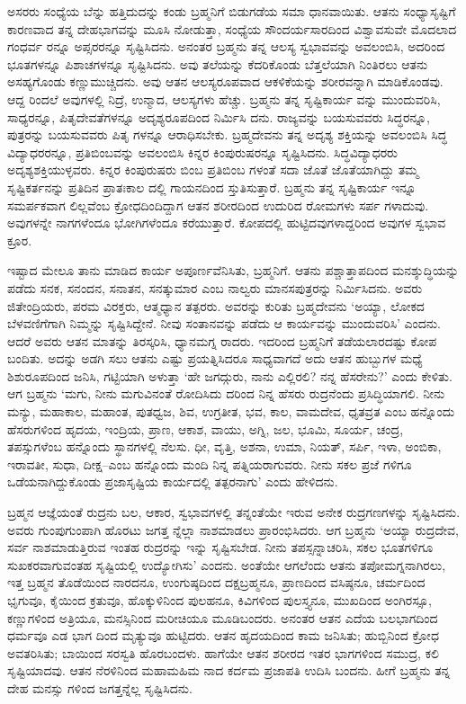ಅಸರರು ಸಂಧ್ಯೆಯ ಬೆನ್ನು ಹತ್ತಿದುದನ್ನು ಕಂಡು ಬ್ರಹ್ಮನಿಗೆ ಬಿಡುಗಡೆಯ ಸಮಾ ಧಾನವಾಯಿತು. ಆತನು ಸಂಧ್ಯಾಸೃಷ್ಟಿಗೆ ಕಾರಣವಾದ ತನ್ನ ದೇಹಭಾಗವನ್ನು ಮೂಸಿ ನೋಡುತ್ತಾ, ಸಂಧ್ಯೆಯ ಸೌಂದರ್ಯಸಾರದಿಂದ ವಿಶ್ವಾವಸುವೇ ಮೊದಲಾದ ಗಂಧರ್ವ ರನ್ನೂ ಅಪ್ಸರರನ್ನೂ ಸೃಷ್ಟಿಸಿದನು. ಅನಂತರ ಬ್ರಹ್ಮನು ತನ್ನ ಆಲಸ್ಯ ಸ್ವಭಾವವನ್ನು ಅವಲಂಬಿಸಿ, ಅದರಿಂದ ಭೂತಗಳನ್ನೂ ಪಿಶಾಚಗಳನ್ನೂ ಸೃಷ್ಟಿಸಿದನು. ಅವು ತಲೆಯನ್ನು ಕೆದರಿಕೊಂಡು ಬೆತ್ತಲೆಯಾಗಿ ನಿಂತಿರಲು ಆತನು ಅಸಹ್ಯಗೊಂಡು ಕಣ್ಣುಮುಚ್ಚಿದನು. ಅವು ಆತನ ಆಲಸ್ಯರೂಪವಾದ ಆಕಳಿಕೆಯನ್ನು ಶರೀರವನ್ನಾಗಿ ಮಾಡಿಕೊಂಡವು. ಆದ್ದ ರಿಂದಲೆ ಅವುಗಳಲ್ಲಿ ನಿದ್ರೆ, ಉನ್ಮಾದ, ಆಲಸ್ಯಗಳು ಹೆಚ್ಚು. ಬ್ರಹ್ಮನು ತನ್ನ ಸೃಷ್ಟಿಕಾರ್ಯ ವನ್ನು ಮುಂದುವರಿಸಿ, ಸಾಧ್ಯರನ್ನೂ, ಪಿತೃದೇವತೆಗಳನ್ನೂ ಅದೃಶ್ಯರೂಪದಿಂದ ನಿರ್ಮಿಸಿ ದನು. ರಾಜ್ಯವನ್ನು ಬಯಸುವವರು ಸಿದ್ಧರನ್ನೂ, ಪುತ್ರರನ್ನು ಬಯಸುವವರು ಪಿತೃ ಗಳನ್ನೂ ಆರಾಧಿಸಬೇಕು. ಬ್ರಹ್ಮದೇವನು ತನ್ನ ಅದೃಶ್ಯ ಶಕ್ತಿಯನ್ನು ಅವಲಂಬಿಸಿ ಸಿದ್ಧ ವಿದ್ಯಾಧರರನ್ನೂ, ಪ್ರತಿಬಿಂಬವನ್ನು ಅವಲಂಬಿಸಿ ಕಿನ್ನರ ಕಿಂಪುರುಷರನ್ನೂ ಸೃಷ್ಟಿಸಿದನು. ಸಿದ್ಧವಿದ್ಯಾಧರರು ಅದೃಶ್ಯಶಕ್ತಿಯುಳ್ಳವರು. ಕಿನ್ನರ ಕಿಂಪುರುಷರು ಬಿಂಬ ಪ್ರತಿಬಿಂಬ ಗಳಂತೆ ಸದಾ ಜೊತೆ ಜೊತೆಯಾಗಿದ್ದು ತಮ್ಮ ಸೃಷ್ಟಿಕರ್ತನನ್ನು ಪ್ರತಿದಿನ ಪ್ರಾತಃಕಾಲ ದಲ್ಲಿ ಗಾಯನದಿಂದ ಸ್ತುತಿಸುತ್ತಾರೆ. ಬ್ರಹ್ಮನು ತನ್ನ ಸೃಷ್ಟಿಕಾರ್ಯ ಇನ್ನೂ ಸಮರ್ಪಕವಾಗ ಲಿಲ್ಲವೆಂಬ ಕ್ರೋಧದಿಂದಿದ್ದಾಗ ಆತನ ಶರೀರದಿಂದ ಉದುರಿದ ರೋಮಗಳು ಸರ್ಪ ಗಳಾದುವು. ಅವುಗಳನ್ನೇ ನಾಗಗಳೆಂದೂ ಭೋಗಿಗಳೆಂದೂ ಕರೆಯುತ್ತಾರೆ. ಕೋಪದಲ್ಲಿ ಹುಟ್ಟಿದವುಗಳಾದ್ದರಿಂದ ಅವುಗಳ ಸ್ವಭಾವ ಕ್ರೂರ.

ಇಷ್ಟಾದ ಮೇಲೂ ತಾನು ಮಾಡಿದ ಕಾರ್ಯ ಅಪೂರ್ಣವೆನಿಸಿತು, ಬ್ರಹ್ಮನಿಗೆ. ಆತನು ಪಶ್ಚಾತ್ತಾಪದಿಂದ ಮನಶ್ಶುದ್ಧಿಯನ್ನು ಪಡೆದು ಸನಕ, ಸನಂದನ, ಸನಾತನ, ಸನತ್ಕುಮಾರ ಎಂಬ ನಾಲ್ವರು ಮಾನಸಪುತ್ರರನ್ನು ನಿರ್ಮಿಸಿದನು. ಅವರು ಜಿತೇಂದ್ರಿಯರು, ಪರಮ ವಿರಕ್ತರು, ಆತ್ಮಧ್ಯಾನ ತತ್ಪರರು. ಅವರನ್ನು ಕುರಿತು ಬ್ರಹ್ಮದೇವನು ‘ಅಯ್ಯಾ, ಲೋಕದ ಬೆಳವಣಿಗೆಗಾಗಿ ನಿಮ್ಮನ್ನು ಸೃಷ್ಟಿಸಿದ್ದೇನೆ. ನೀವು ಸಂತಾನವನ್ನು ಪಡೆದು ಆ ಕಾರ್ಯವನ್ನು ಮುಂದುವರಿಸಿ’ ಎಂದನು. ಆದರೆ ಅವರು ಆತನ ಮಾತನ್ನು ತಿರಸ್ಕರಿಸಿ, ಧ್ಯಾನಮಗ್ನ ರಾದರು. ಇದರಿಂದ ಬ್ರಹ್ಮನಿಗೆ ತಡೆಯಲಾರದಷ್ಟು ಕೋಪ ಬಂದಿತು. ಅದನ್ನು ಅಡಗಿ ಸಲು ಆತನು ಎಷ್ಟು ಪ್ರಯತ್ನಿಸಿದರೂ ಸಾಧ್ಯವಾಗದೆ ಅದು ಆತನ ಹುಬ್ಬುಗಳ ಮಧ್ಯೆ ಶಿಶುರೂಪದಿಂದ ಜನಿಸಿ, ಗಟ್ಟಿಯಾಗಿ ಅಳುತ್ತಾ ‘ಹೇ ಜಗದ್ಗುರು, ನಾನು ಎಲ್ಲಿರಲಿ? ನನ್ನ ಹೆಸರೇನು?’ ಎಂದು ಕೇಳಿತು. ಆಗ ಬ್ರಹ್ಮನು ‘ಮಗು, ನೀನು ಮಗುವಿನಂತೆ ರೋದಿಸಿದು ದರಿಂದ ನಿನ್ನ ಹೆಸರು ರುದ್ರನೆಂದು ಪ್ರಸಿದ್ಧಿಯಾಗಲಿ. ನೀನು ಮನ್ಯು, ಮಹಾಕಾಲ, ಮಹಾಂತ, ಪುತಧ್ವಜ, ಶಿವ, ಉಗ್ರತೀತ, ಭವ, ಕಾಲ, ವಾಮದೇವ, ಧೃತವ್ರತ ಎಂಬ ಹನ್ನೊಂದು ಹೆಸರುಗಳಿಂದ ಹೃದಯ, ಇಂದ್ರಿಯ, ಪ್ರಾಣ, ಆಕಾಶ, ವಾಯು, ಅಗ್ನಿ, ಜಲ, ಭೂಮಿ, ಸೂರ್ಯ, ಚಂದ್ರ, ತಪಸ್ಸುಗಳೆಂಬ ಹನ್ನೊಂದು ಸ್ಥಾನಗಳಲ್ಲಿ ನೆಲಸು. ಧೀ, ವೃತ್ತಿ, ಅಶನಾ, ಉಮಾ, ನಿಯತ್, ಸರ್ಪಿ, ಇಳಾ, ಅಂಬಿಕಾ, ಇರಾವತೀ, ಸುಧಾ, ದೀಕ್ಷ–ಎಂಬ ಹನ್ನೊಂದು ಮಂದಿ ನಿನ್ನ ಪತ್ನಿಯರಾಗುವರು. ನೀನು ಸಕಲ ಪ್ರಜೆ ಗಳಿಗೂ ಒಡೆಯನಾಗಿದ್ದುಕೊಂಡು ಪ್ರಜಾಸೃಷ್ಟಿಯ ಕಾರ್ಯದಲ್ಲಿ ತತ್ಪರನಾಗು’ ಎಂದು ಹೇಳಿದನು.

ಬ್ರಹ್ಮನ ಆಜ್ಞೆಯಂತೆ ರುದ್ರನು ಬಲ, ಆಕಾರ, ಸ್ವಭಾವಗಳಲ್ಲಿ ತನ್ನಂತೆಯೇ ಇರುವ ಅನೇಕ ರುದ್ರಗಣಗಳನ್ನು ಸೃಷ್ಟಿಸಿದನು. ಅವರು ಗುಂಪುಗುಂಪಾಗಿ ಹೊರಟು ಜಗತ್ತ ನ್ನೆಲ್ಲಾ ನಾಶಮಾಡಲು ಪ್ರಾರಂಭಿಸಿದರು. ಆಗ ಬ್ರಹ್ಮನು ‘ಅಯ್ಯಾ ರುದ್ರದೇವ, ಸರ್ವ ನಾಶಮಾಡುತ್ತಿರುವ ಇಂತಹ ರುದ್ರರನ್ನು ಇನ್ನು ಸೃಷ್ಟಿಸಬೇಡ. ನೀನು ತಪಸ್ಸನ್ನಾಚರಿಸಿ, ಸಕಲ ಭೂತಗಳಿಗೂ ಸುಖಕರವಾಗುವಂತಹ ಸೃಷ್ಟಿಯಲ್ಲಿ ಉದ್ಯೋಗಿಸು’ ಎಂದನು. ಅಂತೆಯೇ ಆಗಲೆಂದು ಆತನು ತಪೋಮಗ್ನನಾಗಿರಲು, ಇತ್ತ ಬ್ರಹ್ಮನ ತೊಡೆಯಿಂದ ನಾರದನೂ, ಉಂಗುಷ್ಠದಿಂದ ದಕ್ಷಬ್ರಹ್ಮನೂ, ಪ್ರಾಣದಿಂದ ವಸಿಷ್ಠನೂ, ಚರ್ಮದಿಂದ ಭೃಗುವೂ, ಕೈಯಿಂದ ಕ್ರತುವೂ, ಹೊಕ್ಕುಳಿನಿಂದ ಪುಲಹನೂ, ಕಿವಿಗಳಿಂದ ಪುಲಸ್ತ್ಯನೂ, ಮುಖದಿಂದ ಅಂಗಿರಸ್ಸೂ, ಕಣ್ಣುಗಳಿಂದ ಅತ್ರಿಯೂ, ಮನಸ್ಸಿನಿಂದ ಮರೀಚಿಯೂ ಮೂಡಿಬಂದರು. ಅನಂತರ ಆತನ ಎದೆಯ ಬಲಭಾಗದಿಂದ ಧರ್ಮವೂ ಎಡ ಭಾಗ ದಿಂದ ಮೃತ್ಯುವೂ ಹುಟ್ಟಿದರು. ಆತನ ಹೃದಯದಿಂದ ಕಾಮ ಜನಿಸಿತು; ಹುಬ್ಬಿನಿಂದ ಕ್ರೋಧ ಅವತರಿಸಿತು; ಬಾಯಿಂದ ಸರಸ್ವತಿ ಹೊರಬಂದಳು. ಹಾಗೆಯೇ ಆತನ ಶರೀರದ ಇತರ ಭಾಗಗಳಿಂದ ಸಮುದ್ರ, ಕಲಿ ಸೃಷ್ಟಿಯಾದವು. ಆತನ ನೆರಳಿನಿಂದ ಮಹಾಮಹಿಮ ನಾದ ಕರ್ದಮ ಪ್ರಜಾಪತಿ ಉದಿಸಿ ಬಂದನು. ಹೀಗೆ ಬ್ರಹ್ಮನು ತನ್ನ ದೇಹ ಮನಸ್ಸು ಗಳಿಂದ ಜಗತ್ತನ್ನೆಲ್ಲ ಸೃಷ್ಟಿಸಿದನು.

